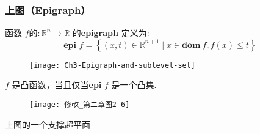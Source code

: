 \documentclass[handout,10pt]{beamer}
\begin{document}
\begin{frame}
	\frametitle{上图（Epigraph）}
	
函数 $f的: \mathbb{R}^{n} \rightarrow \mathbb{R}$ 的\textbf{epigraph} 定义为:
    \begin{equation}
    	\textbf{ epi } f=\left\{(x, t) \in \mathbb{R}^{n+1} \mid x \in \textbf{dom}\ f, f(x) \leq t\right\}
    \end{equation}
     \begin{figure}
    	\centering
    	\texttt{[image: Ch3-Epigraph-and-sublevel-set]}
    \end{figure}
    


\begin{mytheorem}[凸函数的Epigraph**]
  $f$ 是凸函数，当且仅当\textbf{epi} $f$ 是一个凸集.
\end{mytheorem}

\begin{figure}
	\centering
	\texttt{[image: 修改\_第二章图2-6]}
\end{figure}
\quad \quad  \quad \quad  \quad  \quad \quad \quad \quad \quad \quad 上图的一个支撑超平面


\end{frame}
\end{document}
